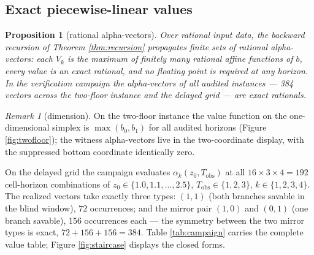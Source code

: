 \documentclass[10pt,twocolumn]{article}
\theoremstyle{plain}
\newtheorem{proposition}[theorem]{Proposition}
\theoremstyle{definition}
\theoremstyle{remark}
\newtheorem{remark}[theorem]{Remark}
\begin{document}
\subsection{Exact piecewise-linear values}\label{exact}

\begin{proposition}[rational alpha-vectors]\label{prop:pl}
Over rational input data, the backward recursion of Theorem
\ref{thm:recursion} propagates finite sets of rational alpha-vectors:
each \(V_{k}\) is the maximum of finitely many rational affine functions
of \(b\), every value is an exact rational, and no floating point is
required at any horizon. In the verification campaign the alpha-vectors
of all audited instances --- 384 vectors across the two-floor instance
and the delayed grid --- are exact rationals.
\end{proposition}

\begin{remark}[dimension]\label{rem:dim}
On the two-floor instance the value function on the one-dimensional
simplex is \(\max(b_{0}, b_{1})\) for all audited horizons (Figure
\ref{fig:twofloor}); the witness alpha-vectors live in the two-coordinate
display, with the suppressed bottom coordinate identically zero.
\end{remark}

On the delayed grid the campaign evaluates
\(\alpha_{k}(z_{0}, T_{\mathrm{obs}})\) at all
\(16 \times 3 \times 4 = 192\) cell-horizon combinations of
\(z_{0} \in \{1.0, 1.1, \dots, 2.5\}\),
\(T_{\mathrm{obs}} \in \{1, 2, 3\}\), \(k \in \{1, 2, 3, 4\}\). The
realized vectors take exactly three types:
\((1, 1)\) (both branches savable in the blind window), \(72\)
occurrences; and the mirror pair \((1, 0)\) and \((0, 1)\) (one branch
savable), \(156\) occurrences each --- the symmetry between the two
mirror types is exact, \(72 + 156 + 156 = 384\). Table \ref{tab:campaign} carries the
complete value table; Figure \ref{fig:staircase} displays the closed
forms.
\end{document}
